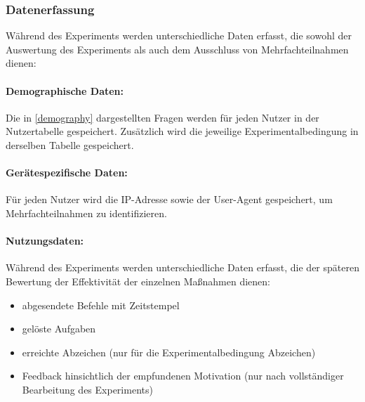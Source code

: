 \subsubsection{Datenerfassung}
Während des Experiments werden unterschiedliche Daten erfasst, die sowohl der Auswertung des Experiments als auch dem Ausschluss von Mehrfachteilnahmen dienen:

\paragraph{Demographische Daten:}
Die in \ref{demography} dargestellten Fragen werden für jeden Nutzer in der Nutzertabelle gespeichert. Zusätzlich wird die jeweilige Experimentalbedingung in derselben Tabelle gespeichert.

\paragraph{Gerätespezifische Daten:}
Für jeden Nutzer wird die IP-Adresse sowie der User-Agent gespeichert, um Mehrfachteilnahmen zu identifizieren.

\paragraph{Nutzungsdaten:}
Während des Experiments werden unterschiedliche Daten erfasst, die der späteren Bewertung der Effektivität der einzelnen Maßnahmen dienen:

\begin{itemize}
	 \item abgesendete Befehle mit Zeitstempel
	 \item gelöste Aufgaben 
	 \item erreichte Abzeichen (nur für die Experimentalbedingung Abzeichen)
	 \item Feedback hinsichtlich der empfundenen Motivation (nur nach vollständiger Bearbeitung des Experiments)
\end{itemize}


